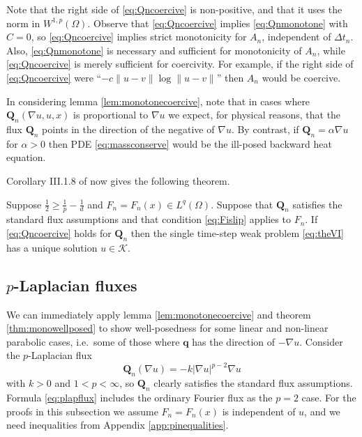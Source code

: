 \documentclass[final,leqno,onefignum,onetabnum]{siamltex1213bueler}
\newcommand\bq{\mathbf{q}}
\newcommand\bQ{\mathbf{Q}}
\renewcommand{\grad}{\nabla}
\begin{document}
Note that the right side of \eqref{eq:Qncoercive} is non-positive, and that it uses the norm in $W^{1,p}(\Omega)$.  Observe that \eqref{eq:Qncoercive} implies \eqref{eq:Qnmonotone} with $C=0$, so \eqref{eq:Qncoercive} implies strict monotonicity for $A_n$, independent of $\Delta t_n$.  Also, \eqref{eq:Qnmonotone} is necessary and sufficient for monotonicity of $A_n$, while \eqref{eq:Qncoercive} is merely sufficient for coercivity.  For example, if the right side of \eqref{eq:Qncoercive} were ``$- c \|u-v\| \log \|u-v\|$'' then $A_n$ would be coercive.

In considering lemma \ref{lem:monotonecoercive}, note that in cases where $\bQ_n(\grad u,u,x)$ is proportional to $\grad u$ we expect, for physical reasons, that the flux $\bQ_n$ points in the direction of the negative of $\grad u$.  By contrast, if $\bQ_n = \alpha \grad u$ for $\alpha>0$ then PDE \eqref{eq:massconserve} would be the ill-posed backward heat equation.

Corollary III.1.8 of \cite{KinderlehrerStampacchia1980} now gives the following theorem.

\medskip
\begin{theorem}  \label{thm:monowellposed}  Suppose $\frac{1}{2} \ge \frac{1}{p} - \frac{1}{d}$ and $F_n=F_n(x)\in L^q(\Omega)$.  Suppose that $\bQ_n$ satisfies the standard flux assumptions and that condition \eqref{eq:Fislip} applies to $F_n$.  If \eqref{eq:Qncoercive} holds for $\bQ_n$ then the single time-step weak problem \eqref{eq:theVI} has a unique solution $u\in\mathcal{K}$.
\end{theorem}

\subsection{$p$-Laplacian fluxes} \label{subsec:plap}  We can immediately apply lemma \ref{lem:monotonecoercive} and theorem \ref{thm:monowellposed} to show well-posedness for some linear and non-linear parabolic cases, i.e.~some of those where $\bq$ has the direction of $-\grad u$.  Consider the $p$-Laplacian \cite{Evans1998} flux
\begin{equation}
  \bQ_n(\grad u) = - k |\grad u|^{p-2} \grad u \label{eq:plapflux}
\end{equation}
with $k>0$ and $1<p<\infty$, so $\bQ_n$ clearly satisfies the standard flux assumptions.  Formula \eqref{eq:plapflux} includes the ordinary Fourier flux as the $p=2$ case.  For the proofs in this subsection we assume $F_n=F_n(x)$ is independent of $u$, and we need inequalities from Appendix \ref{app:pinequalities}.
\end{document}
